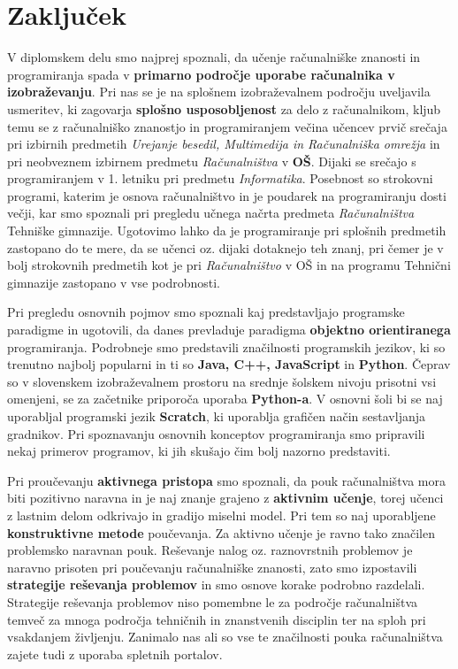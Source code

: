 \section{Zaključek}
\label{sec:zakljuek}

V diplomskem delu smo najprej spoznali, da učenje računalniške
znanosti in programiranja spada v \textbf{primarno področje uporabe
  računalnika v izobraževanju}. Pri nas se je na splošnem
izobraževalnem področju uveljavila usmeritev, ki zagovarja
\textbf{splošno usposobljenost} za delo z računalnikom, kljub temu se
z računalniško znanostjo in programiranjem večina učencev prvič
srečaja pri izbirnih predmetih \emph{Urejanje besedil, Multimedija in
  Računalniška omrežja} in pri neobveznem izbirnem predmetu
\emph{Računalništva} v \textbf{OŠ}. Dijaki se srečajo s programiranjem
v 1. letniku pri predmetu \emph{Informatika}. Posebnost so strokovni
programi, katerim je osnova računalništvo in je poudarek na
programiranju dosti večji, kar smo spoznali pri pregledu učnega načrta
predmeta \emph{Računalništva} Tehniške gimnazije. Ugotovimo lahko da
je programiranje pri splošnih predmetih zastopano do te mere, da se
učenci oz. dijaki dotaknejo teh znanj, pri čemer je v bolj strokovnih
predmetih kot je pri \emph{Računalništvo} v OŠ in na programu Tehnični
gimnazije zastopano v vse podrobnosti.

Pri pregledu osnovnih pojmov smo spoznali kaj predstavljajo programske
paradigme in ugotovili, da danes prevladuje paradigma \textbf{objektno
  orientiranega} programiranja. Podrobneje smo predstavili značilnosti
programskih jezikov, ki so trenutno najbolj popularni in ti so
\textbf{Java, C++, JavaScript} in \textbf{Python}. Čeprav so v
slovenskem izobraževalnem prostoru na srednje šolskem nivoju prisotni
vsi omenjeni, se za začetnike priporoča uporaba \textbf{Python-a}. V
osnovni šoli bi se naj uporabljal programski jezik \textbf{Scratch},
ki uporablja grafičen način sestavljanja gradnikov. Pri spoznavanju
osnovnih konceptov programiranja smo pripravili nekaj primerov
programov, ki jih skušajo čim bolj nazorno predstaviti.

Pri proučevanju \textbf{aktivnega pristopa} smo spoznali, da pouk
računalništva mora biti pozitivno naravna in je naj znanje grajeno z
\textbf{aktivnim učenje}, torej učenci z lastnim delom odkrivajo in
gradijo miselni model. Pri tem so naj uporabljene
\textbf{konstruktivne metode} poučevanja. Za aktivno učenje je ravno
tako značilen problemsko naravnan pouk. Reševanje nalog
oz. raznovrstnih problemov je naravno prisoten pri poučevanju
računalniške znanosti, zato smo izpostavili \textbf{strategije
  reševanja problemov} in smo osnove korake podrobno
razdelali. Strategije reševanja problemov niso pomembne le za področje
računalništva temveč za mnoga področja tehničnih in znanstvenih
disciplin ter na sploh pri vsakdanjem življenju. Zanimalo nas ali so
vse te značilnosti pouka računalništva zajete tudi z uporaba spletnih
portalov.

